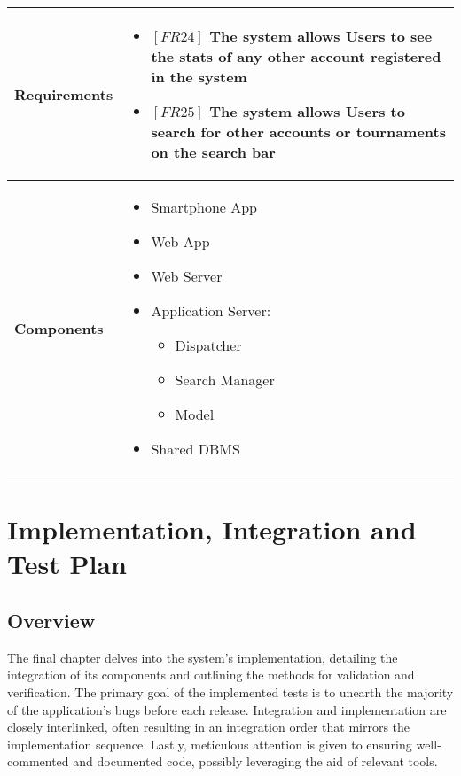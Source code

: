 \documentclass{article}
\begin{document}
\begin{table}[H]
 \renewcommand{\arraystretch}{1.5}
    \centering
    \begin{tabular}{|l|p{10cm}|}
        \hline
        \textbf{Requirements} &
        \vspace{-0.6cm}
        \begin{itemize}[label={}, left=0pt, align=left, itemsep=5pt]
            \item $[FR24]$ The system allows Users to see the stats of any other account registered in the system
            \item $[FR25]$ The system allows Users to search for other accounts or tournaments on the search bar
        \end{itemize} \\
        \hline
        \textbf{Components} & 
        \begin{itemize}[align=left, topsep=0pt, partopsep=0pt]
            \item Smartphone App
            \item Web App
            \item Web Server
            \item Application Server:
            \begin{itemize}
                \item Dispatcher
                \item Search Manager
                \item Model
            \end{itemize}
            \item Shared DBMS 
        \end{itemize} \\
        \hline
    \end{tabular}
\end{table}

\section{Implementation, Integration and Test Plan}
\subsection{Overview}
The final chapter delves into the system's implementation, detailing the integration of its components and outlining the methods for validation and verification. The primary goal of the implemented tests is to unearth the majority of the application's bugs before each release. Integration and implementation are closely interlinked, often resulting in an integration order that mirrors the implementation sequence. Lastly, meticulous attention is given to ensuring well-commented and documented code, possibly leveraging the aid of relevant tools.
\end{document}
